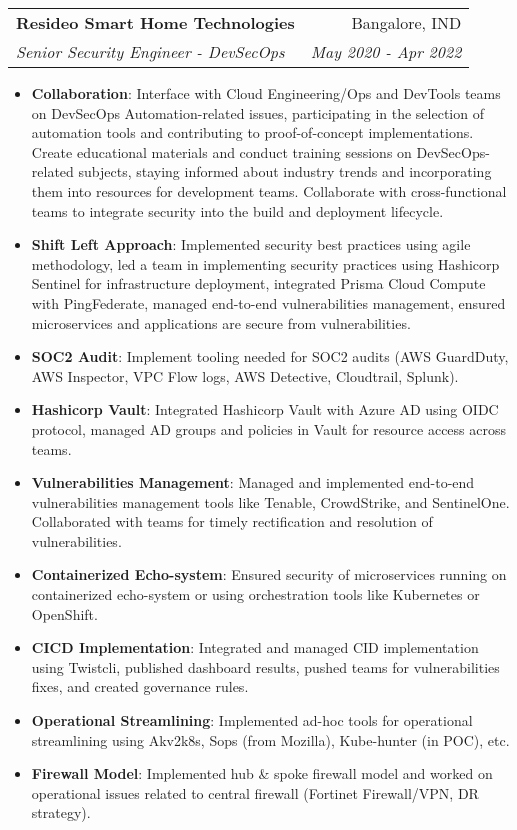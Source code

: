 \documentclass[letterpaper,11pt]{article}
\makeatletter
\newcommand{\resumeItem}[2]{
  \item\small{
    \textbf{#1}{: #2 \vspace{-2pt}}
  }
}
\newcommand{\resumeSubheading}[4]{
  \vspace{-1pt}\item
    \begin{tabular*}{0.97\textwidth}{l@{\extracolsep{\fill}}r}
      \textbf{#1} & #2 \\
      \textit{\small#3} & \textit{\small #4} \\
    \end{tabular*}\vspace{-5pt}
}
\newcommand{\resumeItemListStart}{\begin{itemize}}
\newcommand{\resumeItemListEnd}{\end{itemize}\vspace{-5pt}}
\makeatother
\begin{document}
    \resumeSubheading
    {Resideo Smart Home Technologies}{Bangalore, IND}
    {Senior Security Engineer - DevSecOps}{May 2020 - Apr 2022}
      \resumeItemListStart
        \resumeItem{Collaboration}
          {Interface with Cloud Engineering/Ops and DevTools teams on DevSecOps Automation-related issues, participating in the selection of automation tools and contributing to proof-of-concept implementations.
          Create educational materials and conduct training sessions on DevSecOps-related subjects, staying informed about industry trends and incorporating them into resources for development teams.
          Collaborate with cross-functional teams to integrate security into the build and deployment lifecycle.}
        \resumeItem{Shift Left Approach}
          {Implemented security best practices using agile methodology, led a team in implementing security practices using Hashicorp Sentinel for infrastructure deployment, integrated Prisma Cloud Compute with PingFederate, managed end-to-end vulnerabilities management, ensured microservices and applications are secure from vulnerabilities.}
        \resumeItem{SOC2 Audit}
          {Implement tooling needed for SOC2 audits (AWS GuardDuty, AWS Inspector, VPC Flow logs, AWS Detective, Cloudtrail, Splunk).}
        \resumeItem{Hashicorp Vault}
          {Integrated Hashicorp Vault with Azure AD using OIDC protocol, managed AD groups and policies in Vault for resource access across teams.}
        \resumeItem{Vulnerabilities Management}
          {Managed and implemented end-to-end vulnerabilities management tools like Tenable, CrowdStrike, and SentinelOne. Collaborated with teams for timely rectification and resolution of vulnerabilities.}
        \resumeItem{Containerized Echo-system}
          {Ensured security of microservices running on containerized echo-system or using orchestration tools like Kubernetes or OpenShift.}
        \resumeItem{CICD Implementation}
          {Integrated and managed CID implementation using Twistcli, published dashboard results, pushed teams for vulnerabilities fixes, and created governance rules.}
        \resumeItem{Operational Streamlining}
          {Implemented ad-hoc tools for operational streamlining using Akv2k8s, Sops (from Mozilla), Kube-hunter (in POC), etc.}
        \resumeItem{Firewall Model}
          {Implemented hub \& spoke firewall model and worked on operational issues related to central firewall (Fortinet Firewall/VPN, DR strategy).}
      \resumeItemListEnd
\end{document}

